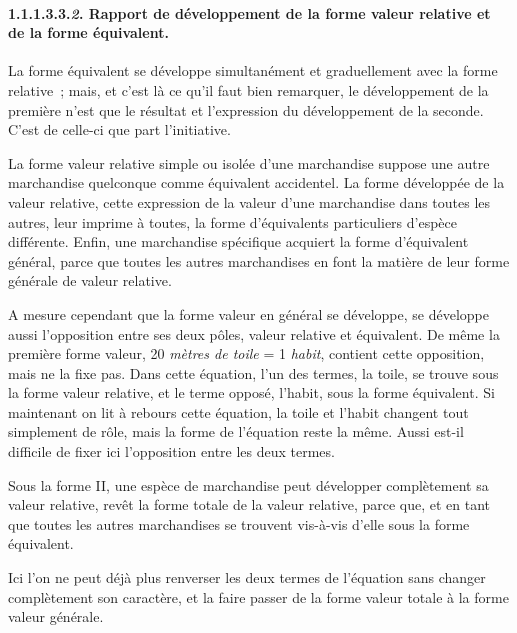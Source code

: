 \documentclass[french,twoside]{book} %
\begin{document}
\paragraph[{1.1.1.3.3.2. Rapport de développement de la forme valeur relative et de la forme équivalent.}]{1.1.1.3.3.\emph{2}. Rapport de développement de la forme valeur relative et de la forme équivalent.}
\noindent La forme équivalent se développe simultanément et graduellement avec la forme relative ; mais, et c’est là ce qu’il faut bien remarquer, le développement de la première n’est que le résultat et l’expression du développement de la seconde. C’est de celle-ci que part l’initiative.\par
La forme valeur relative simple ou isolée d’une marchandise suppose une autre marchandise quelconque comme équivalent accidentel. La forme développée de la valeur relative, cette expression de la valeur d’une marchandise dans toutes les autres, leur imprime à toutes, la forme d’équivalents particuliers d’espèce différente. Enfin, une marchandise spécifique acquiert la forme d’équivalent général, parce que toutes les autres marchandises en font la matière de leur forme générale de valeur relative.\par
A mesure cependant que la forme valeur en général se développe, se développe aussi l’opposition entre ses deux pôles, valeur relative et équivalent. De même la première forme valeur, 20 \emph{mètres de toile} = 1\emph{ habit}, contient cette opposition, mais ne la fixe pas. Dans cette équation, l’un des termes, la toile, se trouve sous la forme valeur relative, et le terme opposé, l’habit, sous la forme équivalent. Si maintenant on lit à rebours cette équation, la toile et l’habit changent tout simplement de rôle, mais la forme de l’équation reste la même. Aussi est-il difficile de fixer ici l’opposition entre les deux termes.\par
Sous la forme II, une espèce de marchandise peut développer complètement sa valeur relative, revêt la forme totale de la valeur relative, parce que, et en tant que toutes les autres marchandises se trouvent vis-à-vis d’elle sous la forme équivalent.\par
Ici l’on ne peut déjà plus renverser les deux termes de l’équation sans changer complètement son caractère, et la faire passer de la forme valeur totale à la forme valeur générale.\par
\end{document}
